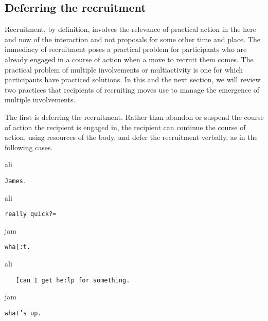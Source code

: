 \documentclass[output=paper,nonflat,modfont,draft]{langsci/langscibook}
\begin{document}
\subsection{Deferring the recruitment}
Recruitment, by definition, involves the relevance of practical action in the here and now of the interaction and not proposals for some other time and place. The immediacy of recruitment poses a practical problem for participants who are already engaged in a course of action when a move to recruit them comes. The practical problem of multiple involvements \citep{ToerienKitzinger2007, RaymondLerner2014} or multiactivity \citep{Mondada2011, haddington2014multiactivity} is one for which participants have practiced solutions. In this and the next section, we will review two practices that recipients of recruiting moves use to manage the emergence of multiple involvements.

The first is deferring the recruitment. Rather than abandon or suspend the course of action the recipient is engaged in, the recipient can continue the course of action, using resources of the body, and defer the recruitment verbally, as in the following cases.


\begin{transbox}{4}{ali}
\begin{verbatim}
James.
\end{verbatim}
\end{transbox}


\begin{transbox}{6}{ali}
\begin{verbatim}
really quick?=
\end{verbatim}
\end{transbox}

\begin{transbox}{7}{jam}
\begin{verbatim}
wha[:t.
\end{verbatim}
\end{transbox}

\begin{transbox}{8}{ali}
\begin{verbatim}
   [can I get he:lp for something.
\end{verbatim}
\end{transbox}

\begin{transbox}{9}{jam}
\begin{verbatim}
what’s up.
\end{verbatim}
\end{transbox}
\end{document}
